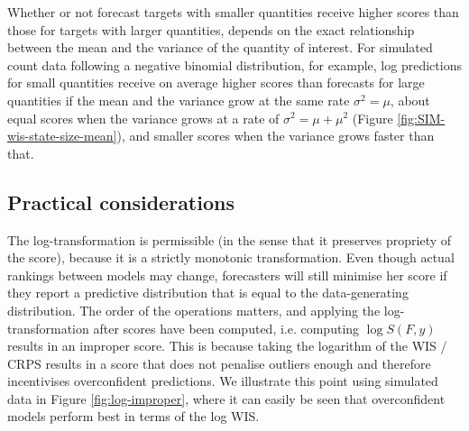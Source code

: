 \documentclass{article}
\begin{document}
Whether or not forecast targets with smaller quantities receive higher scores than those for targets with larger quantities, depends on the exact relationship between the mean and the variance of the quantity of interest. For simulated count data following a negative binomial distribution, for example, log predictions for small quantities receive on average higher scores than forecasts for large quantities if the mean and the variance grow at the same rate $\sigma^2 = \mu$, about equal scores when the variance grows at a rate of $\sigma^2 = \mu + \mu^2$ (Figure \ref{fig:SIM-wis-state-size-mean}), and smaller scores when the variance grows faster than that. 

\subsection{Practical considerations}

The log-transformation is permissible (in the sense that it preserves propriety of the score), because it is a strictly monotonic transformation. Even though actual rankings between models may change, forecasters will  still minimise her score if they report a predictive distribution that is equal to the data-generating distribution. The order of the operations matters, and applying the log-transformation after scores have been computed, i.e. computing $\log S(F, y)$ results in an improper score. This is because taking the logarithm of the WIS / CRPS results in a score that does not penalise outliers enough and therefore incentivises overconfident predictions. We illustrate this point using simulated data in Figure \ref{fig:log-improper}, where it can easily be seen that overconfident models perform best in terms of the log WIS. 
\end{document}
